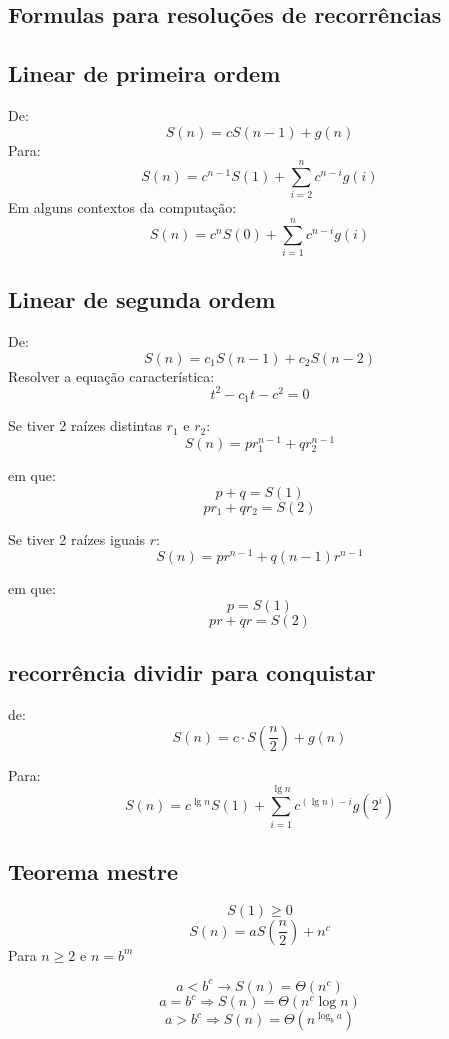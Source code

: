 \begin{tcolorbox}[sharp corners, colback=white,boxrule=1mm]
\section{Formulas para resoluções de recorrências}
\subsection{Linear de primeira ordem}
De:
\[S(n) = cS(n-1) + g(n)\]
Para:
\[S(n) = c^{n-1}S(1) + \sum_{i=2}^{n}c^{n-i}g(i)\]
Em alguns contextos da computação:
\[S(n) = c^{n}S(0) + \sum_{i=1}^{n}c^{n-i}g(i)\]

\subsection{Linear de segunda ordem}
De:
\[S(n) = c_1S(n-1) + c_2S(n-2)\]
Resolver a equação característica:
\[t^2 - c_1t - c^2 = 0\]

Se tiver 2 raízes distintas $r_1$ e $r_2$:
\[S(n) = pr_1^{n-1} + qr_2^{n-1}\]

em que:
\[p + q = S(1)\]
\[pr_1 + qr_2 = S(2)\]

Se tiver 2 raízes iguais \(r\):
\[S(n) = pr^{n-1} + q(n-1)r^{n-1}\]

em que:
\[p = S(1)\]
\[pr + qr = S(2)\]

\subsection{recorrência dividir para conquistar}
de:
\[S(n) = c\cdot S\left ( \frac n2 \right ) + g(n)\]

Para:
\[S(n) = c^{\lg n}S(1) + \sum_{i=1}^{\lg n}c^{(\lg n) - i}g(2^i)\]

\subsection{Teorema mestre}
\[S(1) \geq 0\]
\[S(n) = aS\left(\frac{n}{2}\right) + n^c\]
Para \(n \geq 2\) e \(n = b^m\)

\[a < b^c \rightarrow S(n) = \Theta(n^c)\]
\[a = b^c \Rightarrow S(n) = \Theta(n^c \log n)\]
\[a > b^c \Rightarrow S(n) = \Theta(n^{\log_b a})\]
\end{tcolorbox}